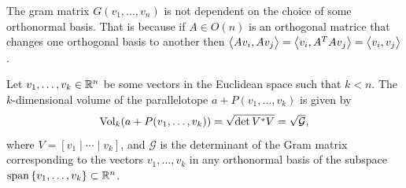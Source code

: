 \documentclass[11pt,a4paper]{article}
\begin{document}
\begin{remark}
  The gram matrix $G(v_1,\dots,v_n)$ is not dependent on the choice
  of some orthonormal basis.
  That is because if $A \in O(n)$ is an orthogonal matrice that changes
  one orthogonal basis to another then
  $\left\langle Av_i, Av_j \right\rangle = \left\langle v_i, A^TAv_j \right\rangle = \left\langle v_i, v_j \right\rangle$.
\end{remark}

\begin{definition}
  Let $v_1,\dots,v_k \in \mathbb{R}^n$ be some vectors in the Euclidean space
  such that $k < n$.
  The $k$-dimensional volume of the parallelotope
  $a + P(v_1,\dots,v_k)$ is given by
  \[
    \operatorname{Vol}_k(a + P(v_1,\dots,v_k)) =
    \sqrt{\det V^* V} =
    \sqrt{\mathcal G},
  \]
  where $V = \left[v_1 \mid \cdots \mid v_k\right]$,
  and $\mathcal G$ is the determinant of the Gram matrix
  corresponding to the vectors $v_1,\dots,v_k$ in any
  orthonormal basis of the subspace $\operatorname{span}\left\{v_1,\dots,v_k\right\} \subset \mathbb{R}^n$.
\end{definition}
\end{document}
